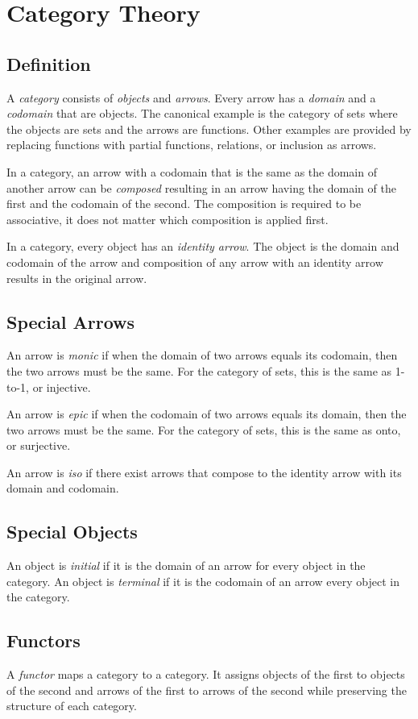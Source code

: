 \chapter{Category Theory} 
\label{cat} 

\section{Definition}
A {\em category} consists of {\em objects} and {\em arrows}. Every
arrow has a {\em domain} and a {\em codomain} that are objects.
The canonical example is the category of sets where the objects
are sets and the arrows are functions. Other examples are provided by
replacing functions with partial functions, relations, or inclusion
as arrows. 

In a category, an arrow with a codomain that is the same as the
domain of another arrow can be {\em composed} resulting in an
arrow having the domain of the first and the codomain of the second.
The composition is required to be associative, it does not matter
which composition is applied first.

In a category, every object has an {\em identity arrow}. The object is
the domain and codomain of the arrow and composition of any arrow with
an identity arrow results in the original arrow.

\section{Special Arrows}
An arrow is {\em monic} if when the domain of two arrows equals its codomain,
then the two arrows must be the same. For the category of sets, this is
the same as 1-to-1, or injective. 

An arrow is {\em epic} if when the codomain of two arrows equals its domain,
then the two arrows must be the same. For the category of sets, this is
the same as onto, or surjective.

An arrow is {\em iso} if there exist arrows that compose to the identity
arrow with its domain and codomain.

\section{Special Objects}
An object is {\em initial} if it is the domain of an arrow for every
object in the category. An object is {\em terminal} if it is the codomain
of an arrow every object in the category.

\section{Functors}
A {\em functor} maps a category to a category. It assigns objects of the
first to objects of the second and arrows of the first to arrows of the
second while preserving the structure of each category.

